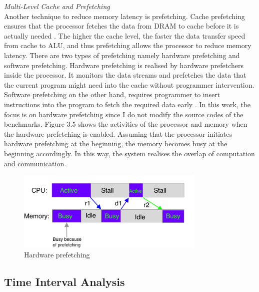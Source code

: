 \textit{Multi-Level Cache and Prefetching}\\
Another technique to reduce memory latency is prefetching. Cache prefetching ensures that the processor fetches the data from DRAM to cache before it is actually needed \cite{14}. The higher the cache level, the faster the data transfer speed from cache to ALU, and thus prefetching allows the processor to reduce memory latency. There are two types of prefetching namely hardware prefetching and software prefetching. Hardware prefetching is realised by hardware prefetchers inside the processor. It monitors the data streams and prefetches the data that the current program might need into the cache without programmer intervention. Software prefetching on the other hand, requires programmer to insert instructions into the program to fetch the required data early \cite{15}. In this work, the focus is on hardware prefetching since I do not modify the source codes of the benchmarks. Figure 3.5 shows the activities of the processor and memory when the hardware prefetching is enabled. Assuming that the processor initiates hardware prefetching at the beginning, the memory becomes busy at the beginning accordingly. In this way, the system realises the overlap of computation and communication. 
\begin{figure} [h] %
	\centering   %
	\includegraphics[width=9cm]{pictures/fig3.7}
	\caption{Hardware prefetching}
	\label{fig3.7}  %
\end{figure}

\subsection{Time Interval Analysis}


